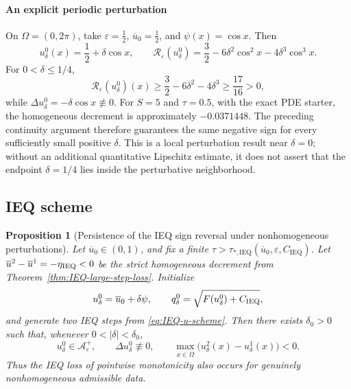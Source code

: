 \documentclass[final, 3p, times]{elsarticle}%
\newcommand{\eps}{\varepsilon}
\newcommand{\Reps}{\mathcal R_\varepsilon}
\newcommand{\Aepsp}{\mathcal A_\varepsilon^+}
\newcommand{\Aeps}{\Aepsp}
\newtheorem{proposition}[theorem]{Proposition}
\begin{document}
\paragraph{An explicit periodic perturbation}
On $\Omega=(0,2\pi)$, take $\eps=\frac12$,
$\overline u_0=\frac12$, and $\psi(x)=\cos x$. Then
\[
    u^0_\delta(x)=\frac12+\delta\cos x,
    \qquad
    \Reps(u^0_\delta)
    =\frac32-6\delta^2\cos^2x-4\delta^3\cos^3x.
\]
For $0<\delta\le1/4$,
\[
    \Reps(u^0_\delta)(x)
    \ge \frac32-6\delta^2-4\delta^3
    \ge\frac{17}{16}>0,
\]
while $\Delta u^0_\delta=-\delta\cos x\not\equiv0$. For $S=5$ and
$\tau=0.5$, with the exact PDE starter, the homogeneous decrement is
approximately $-0.0371448$. The preceding continuity argument therefore
guarantees the same negative sign for every sufficiently small positive
$\delta$. This is a local perturbation result near $\delta=0$; without an
additional quantitative Lipschitz estimate, it does not assert that the
endpoint $\delta=1/4$ lies inside the perturbative neighborhood.

\subsection{IEQ scheme}
\label{sec:IEQ-nonhomogeneous-persistence}

\begin{proposition}[Persistence of the IEQ sign reversal under nonhomogeneous perturbations]
\label{prop:IEQ-nonhomogeneous-persistence}
Let $\overline u_0\in(0,1)$, and fix a finite
$\tau>\tau_{*,\mathrm{IEQ}}
(\overline u_0,\eps,C_{\mathrm{IEQ}})$. Let
$\overline u^2-\overline u^1=-\eta_{\rm IEQ}<0$ be the strict homogeneous
decrement from Theorem~\ref{thm:IEQ-large-step-loss}. Initialize
\[
    u^0_\delta=\overline u_0+\delta\psi,
    \qquad
    q^0_\delta=\sqrt{F(u^0_\delta)+C_{\rm IEQ}},
\]
and generate two IEQ steps from \eqref{eq:IEQ-u-scheme}. Then there exists
$\delta_0>0$ such that, whenever $0<|\delta|<\delta_0$,
\begin{equation}
    u^0_\delta\in\Aeps,
    \qquad
    \Delta u^0_\delta\not\equiv0,
    \qquad
    \max_{x\in\overline\Omega}
    \bigl(u^2_\delta(x)-u^1_\delta(x)\bigr)<0.
\label{eq:IEQ-perturbation-conclusion}
\end{equation}
Thus the IEQ loss of pointwise monotonicity also occurs for genuinely
nonhomogeneous admissible data.
\end{proposition}
\end{document}
